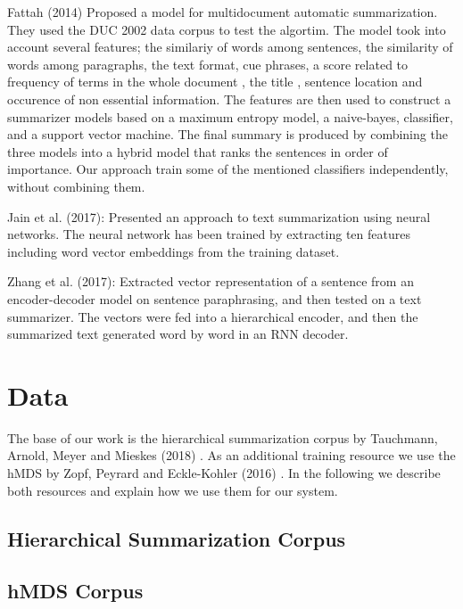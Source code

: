 \documentclass{article}
\begin{document}
Fattah (2014)\citep{Fattah_2014} Proposed a model for multidocument automatic summarization. They used the DUC 2002 data corpus to test the algortim. The model took into account several features; the similariy of words among sentences, the similarity of words among paragraphs, the text format, cue phrases, a score related to frequency of terms in the whole document , the title , sentence location and occurence of non essential information. The features are then used to construct a summarizer models based on a maximum entropy model, a naive-bayes, classifier, and a support vector machine. The final summary is produced by combining the three models into a hybrid model that ranks the sentences in order of importance. Our approach train some of the mentioned classifiers independently, without combining them.

Jain et al. (2017)\cite{Jain.et.al.2017}: Presented an approach to text summarization using neural networks. The neural network has been trained by extracting ten features including word vector embeddings from the training dataset.

Zhang et al. (2017)\cite{zhang2017semantic}: Extracted vector representation of a sentence from an
encoder-decoder  model  on  sentence  paraphrasing,  and  then
tested on a text summarizer. The vectors were fed into a hierarchical encoder, and then the summarized text generated word by word in an RNN decoder. 


\section{Data}
\label{sec:data}

The base of our work is the hierarchical summarization corpus by Tauchmann, Arnold, Meyer and Mieskes (2018) \citep{TAUCHMANN18.252}. As an additional training resource we use the hMDS by Zopf, Peyrard and Eckle-Kohler (2016) \citep{tubiblio97941}. In the following we describe both resources and explain how we use them for our system.

\subsection{Hierarchical Summarization Corpus}



\subsection{hMDS Corpus}
\end{document}
